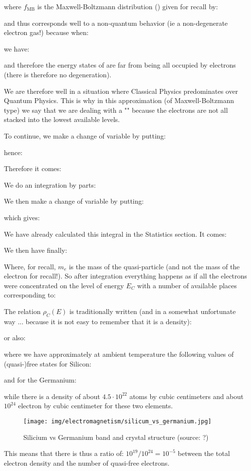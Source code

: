 	where $f_{\text{MB}}$ is the Maxwell-Boltzmann distribution () given for recall by:
	
	and thus corresponds well to a non-quantum behavior (ie a non-degenerate electron gas!) because when:
	
	we have:
	
	and therefore the energy states of are far from being all occupied by electrons (there is therefore no degeneration).

	We are therefore well in a situation where Classical Physics predominates over Quantum Physics. This is why in this approximation (of Maxwell-Boltzmann type) we say that we are dealing with a "" because the electrons are not all stacked into the lowest available levels.

	To continue, we make a change of variable by putting:
	
	hence:
	
	Therefore it comes:
	
	We do an integration by parts:
	
	We then make a change of variable by putting:
	
	which gives:
	
	We have already calculated this integral in the Statistics section. It comes:
	
	We then have finally:
	
	Where, for recall, $m_e$ is the mass of the quasi-particle (and not the mass of the electron for recall!). So after integration everything happens as if all the electrons were concentrated on the level of energy $E_C$ with a number of available places corresponding to:
	
	The relation $\rho_C(E)$ is traditionally written (and in a somewhat unfortunate way ... because it is not easy to remember that it is a density):
	
	or also:
	
	where we have approximately at ambient temperature the following values of (quasi-)free states for Silicon:
	
	and for the Germanium:
	
	while there is a density of about $4.5\cdot 10^{22}$ atoms by cubic centimeters and about $10^{24}$ electron by cubic centimeter for these two elements.
	\begin{figure}[H]
		\centering
		\texttt{[image: img/electromagnetism/silicum\_vs\_germanium.jpg]}
		\caption{Silicium vs Germanium band and crystal structure (source: ?)}
	\end{figure}
	This means that there is thus a ratio of: $10^{19}/10^{24}=10^{-5}$ between the total electron density and the number of quasi-free electrons.

